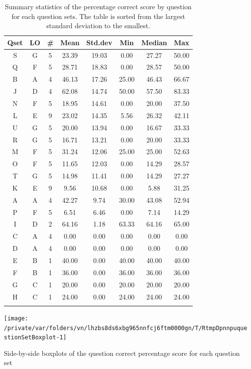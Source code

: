 \documentclass[12pt,english,nohyper]{tufte-handout}\usepackage[]{graphicx}\usepackage[]{color}
\newenvironment{knitrout}{}{} %
\begin{document}
\begin{longtable}{cc|ccc|ccc}
  \hline
Qset & LO & \# & Mean & Std.dev & Min & Median & Max \\ 
  \hline
S & G &   5 & 23.39 & 19.03 & 0.00 & 27.27 & 50.00 \\ 
  Q & F &   5 & 28.71 & 18.83 & 0.00 & 28.57 & 50.00 \\ 
  B & A &   4 & 46.13 & 17.26 & 25.00 & 46.43 & 66.67 \\ 
  J & D &   4 & 62.08 & 14.74 & 50.00 & 57.50 & 83.33 \\ 
  N & F &   5 & 18.95 & 14.61 & 0.00 & 20.00 & 37.50 \\ 
  L & E &   9 & 23.02 & 14.35 & 5.56 & 26.32 & 42.11 \\ 
  U & G &   5 & 20.00 & 13.94 & 0.00 & 16.67 & 33.33 \\ 
  R & G &   5 & 16.71 & 13.21 & 0.00 & 20.00 & 33.33 \\ 
  M & F &   5 & 31.24 & 12.06 & 25.00 & 25.00 & 52.63 \\ 
  O & F &   5 & 11.65 & 12.03 & 0.00 & 14.29 & 28.57 \\ 
  T & G &   5 & 14.98 & 11.41 & 0.00 & 14.29 & 27.27 \\ 
  K & E &   9 & 9.56 & 10.68 & 0.00 & 5.88 & 31.25 \\ 
  A & A &   4 & 42.27 & 9.74 & 30.00 & 43.08 & 52.94 \\ 
  P & F &   5 & 6.51 & 6.46 & 0.00 & 7.14 & 14.29 \\ 
  I & D &   2 & 64.16 & 1.18 & 63.33 & 64.16 & 65.00 \\ 
  C & A &   4 & 0.00 & 0.00 & 0.00 & 0.00 & 0.00 \\ 
  D & A &   4 & 0.00 & 0.00 & 0.00 & 0.00 & 0.00 \\ 
  E & B &   1 & 40.00 & 0.00 & 40.00 & 40.00 & 40.00 \\ 
  F & B &   1 & 36.00 & 0.00 & 36.00 & 36.00 & 36.00 \\ 
  G & C &   1 & 20.00 & 0.00 & 20.00 & 20.00 & 20.00 \\ 
  H & C &   1 & 24.00 & 0.00 & 24.00 & 24.00 & 24.00 \\ 
   \hline
\hline
\caption{Summary statistics of the percentage correct score by question for each question sets. The table is sorted from the largest standard deviation to the smallest.} 
\label{tab:QuestionSet_summary}
\end{longtable}


\begin{knitrout}
\color{fgcolor}\begin{marginfigure}

{\centering \texttt{[image: /private/var/folders/vn/lhzbs8ds6xbg965nnfcj6ftm0000gn/T/RtmpDpnnpuquestionSetBoxplot-1]} 

}

\caption[Side-by-side boxplots of the question correct percentage score for each question set]{Side-by-side boxplots of the question correct percentage score for each question set}\label{fig:questionSetBoxplot}
\end{marginfigure}


\end{knitrout}
\end{document}

